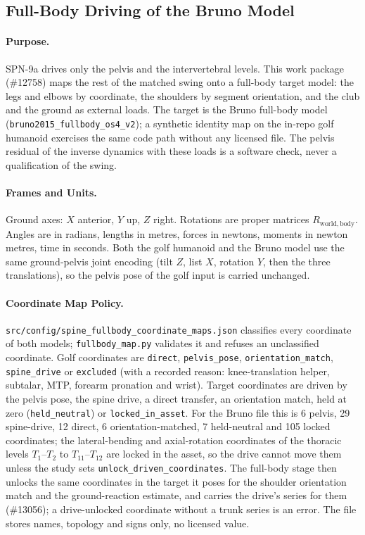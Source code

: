 \subsection{Full-Body Driving of the Bruno Model}
\label{sec:spn-9c}

\paragraph{Purpose.}
SPN-9a drives only the pelvis and the intervertebral levels. This work package
(\#12758) maps the rest of the matched swing onto a full-body target model: the
legs and elbows by coordinate, the shoulders by segment orientation, and the club
and the ground as external loads. The target is the Bruno full-body model
(\texttt{bruno2015\_fullbody\_os4\_v2}); a synthetic identity map on the in-repo
golf humanoid exercises the same code path without any licensed file. The pelvis
residual of the inverse dynamics with these loads is a software check, never a
qualification of the swing.

\paragraph{Frames and Units.}
Ground axes: $X$ anterior, $Y$ up, $Z$ right. Rotations are proper matrices
$R_{\mathrm{world,body}}$. Angles are in radians, lengths in metres, forces in
newtons, moments in newton metres, time in seconds. Both the golf humanoid and the
Bruno model use the same ground-pelvis joint encoding (tilt $Z$, list $X$,
rotation $Y$, then the three translations), so the pelvis pose of the golf input
is carried unchanged.

\paragraph{Coordinate Map Policy.}
\texttt{src/config/spine\_fullbody\_coordinate\_maps.json} classifies every
coordinate of both models; \texttt{fullbody\_map.py} validates it and refuses an
unclassified coordinate. Golf coordinates are \texttt{direct}, \texttt{pelvis\_pose},
\texttt{orientation\_match}, \texttt{spine\_drive} or \texttt{excluded} (with a
recorded reason: knee-translation helper, subtalar, MTP, forearm pronation and
wrist). Target coordinates are driven by the pelvis pose, the spine drive, a
direct transfer, an orientation match, held at zero (\texttt{held\_neutral}) or
\texttt{locked\_in\_asset}. For the Bruno file this is 6 pelvis, 29 spine-drive,
12 direct, 6 orientation-matched, 7 held-neutral and 105 locked coordinates; the
lateral-bending and axial-rotation coordinates of the thoracic levels $T_1$--$T_2$
to $T_{11}$--$T_{12}$ are locked in the asset, so the drive cannot move them
unless the study sets \texttt{unlock\_driven\_coordinates}. The full-body stage
then unlocks the same coordinates in the target it poses for the shoulder
orientation match and the ground-reaction estimate, and carries the drive's
series for them (\#13056); a drive-unlocked coordinate without a trunk series
is an error. The
file stores names, topology and signs only, no licensed value.


